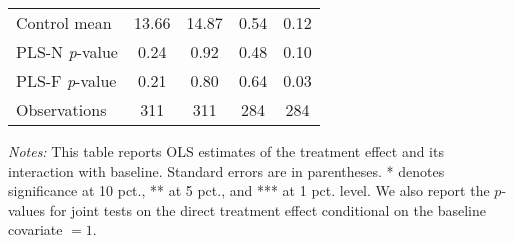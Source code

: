 \begin{table}[ht]
{\begin{threeparttable}
\begin{tabular}{l*{4}{c}}
Control mean    &    13.66         &    14.87         &     0.54         &     0.12         \\
PLS-N \emph{p}-value&     0.24         &     0.92         &     0.48         &     0.10         \\
PLS-F \emph{p}-value&     0.21         &     0.80         &     0.64         &     0.03         \\
Observations    &      311         &      311         &      284         &      284         \\
\bottomrule \end{tabular} \begin{tablenotes}[flushleft] \footnotesize \item \emph{Notes:} This table reports OLS estimates of the treatment effect and its interaction with baseline. Standard errors are in parentheses. * denotes significance at 10 pct., ** at 5 pct., and *** at 1 pct. level. We also report the \(p\)-values for joint tests on the direct treatment effect conditional on the baseline covariate $= 1$. \end{tablenotes} \end{threeparttable} } \end{table}

